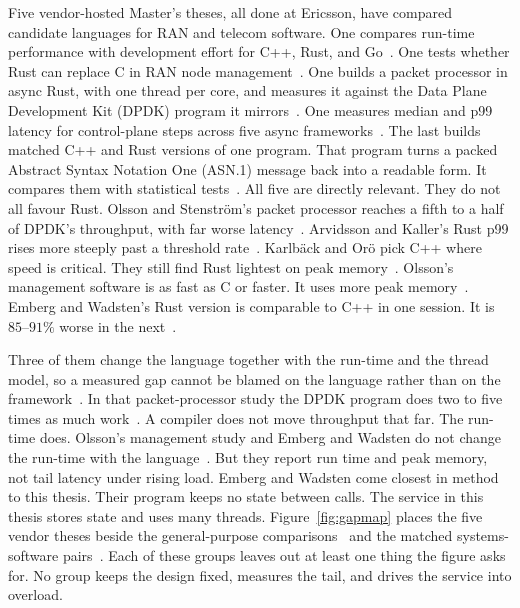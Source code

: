 \documentclass[english,oneside,a4paper,censored,csm,software-track-2020]{HYthesisML}
\begin{document}
Five vendor-hosted Master's theses, all
done at Ericsson, have compared candidate languages for RAN and telecom
software. One compares run-time performance with development effort for C++,
Rust, and Go~\cite{karlback2021ran}. One tests whether Rust can replace C in
RAN node management~\cite{olsson2023ranmgmt}. One builds a packet processor in
async Rust, with one thread per core, and measures it against the Data Plane
Development Kit (DPDK) program it mirrors~\cite{olsson2023asyncpackets}. One
measures median and p99 latency for control-plane steps across five async
frameworks~\cite{arvidsson2025async}. The last builds matched C++ and Rust
versions of one program. That program turns a packed Abstract Syntax Notation
One (ASN.1) message back into a readable form. It compares
them with statistical tests~\cite{emberg2023asn1}. All five are directly
relevant. They do not all favour Rust. Olsson and Stenstr\"om's packet
processor reaches a fifth to a half of DPDK's throughput, with far worse
latency~\cite{olsson2023asyncpackets}. Arvidsson and Kaller's Rust p99 rises
more steeply past a threshold rate~\cite{arvidsson2025async}. Karlb\"ack and
Or\"o pick C++ where speed is critical. They still find Rust lightest on peak
memory~\cite{karlback2021ran}. Olsson's management software is as fast as C or
faster. It uses more peak memory~\cite{olsson2023ranmgmt}. Emberg and
Wadsten's Rust version is comparable to C++ in one session. It is $85$--$91\%$ worse in the
next~\cite{emberg2023asn1}.

Three of them change the language together with the run-time and the thread
model, so a measured gap cannot be blamed on the language rather than on the
framework~\cite{karlback2021ran,olsson2023asyncpackets,arvidsson2025async}.
In that packet-processor study the DPDK program does two to five times as much
work~\cite{olsson2023asyncpackets}. A compiler does not move throughput that
far. The run-time does. Olsson's management study and Emberg and Wadsten do
not change the run-time with the language~\cite{olsson2023ranmgmt,emberg2023asn1}. But they
report run time and peak memory, not tail latency under rising load. Emberg and
Wadsten come closest in method to this thesis. Their program keeps no state
between calls. The service in this thesis stores state and uses many threads.
Figure~\ref{fig:gapmap} places the five vendor theses beside the
general-purpose comparisons~\cite{pereira2017energy} and the matched
systems-software pairs~\cite{emmerich2019drivers,suchert2023stamp}. Each of
these groups leaves out at least one thing the figure asks for. No group keeps
the design fixed, measures the tail, and drives the service into overload.
\end{document}
